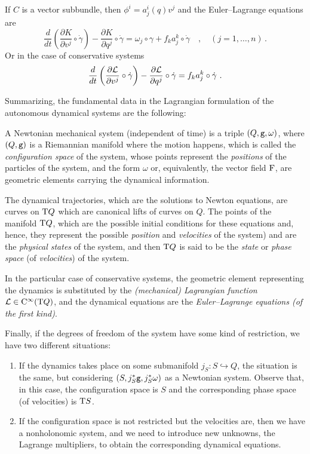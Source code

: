 \documentclass[12pt]{report}
\def\derpar#1#2{\frac{\partial{#1}}{\partial{#2}}}
\def\Lag{{\cal L}}
\def\Tan{{\rm T}}
\def\Cinfty{{\rm C}^\infty}
\begin{document}
If $C$ is a vector subbundle, then  $\phi^i=a^{i}_{j}(q)v^{j}$ and the Euler--Lagrange equations are
$$
\frac{d}{d t}\left(\derpar{K}{v^j}\circ\dot\gamma\right)-
\derpar{K}{q^j}\circ\dot\gamma=
\omega_j\circ\gamma +f_ka^k_j\circ\dot\gamma
\quad , \quad (j=1,\ldots ,n)\, .
$$
Or in the case of conservative systems
$$
\frac{d}{d t}\left(\derpar{\Lag }{v^j}\circ\dot\gamma\right)-
\derpar{\Lag}{q^j}\circ\dot\gamma=
f_ka^k_j\circ\dot\gamma \ .
$$

\vspace{0,5cm}

Summarizing, the fundamental data in the Lagrangian formulation
of the autonomous dynamical systems are the following:

A Newtonian mechanical system (independent of time) is a  triple $(Q,{\tt g},\omega )$, where
$(Q,{\tt g})$ is a Riemannian manifold where the motion happens,
which is called the {\sl configuration space} of the system,
whose points represent the {\sl positions} of the particles of the system,
and
the form $\omega$ or, equivalently, the vector field ${\rm F}$,
are geometric elements carrying the dynamical information.

The dynamical trajectories, which are the solutions to Newton equations, 
are curves on $\Tan Q$ which are canonical lifts of curves on $Q$.
The points of the manifold $\Tan Q$,
which are the possible initial conditions for these equations 
and, hence, they represent  the possible {\sl position} and {\sl velocities}
of the system) and are the {\sl physical states} of the  system, and
then $\Tan Q$ is said to be the
 {\sl state} or {\sl phase space} (of {\sl velocities\/}) of the system.

In the particular case of conservative systems,
the geometric element representing the dynamics is substituted
by the  {\sl (mechanical) Lagrangian function}
$\Lag\in\Cinfty (\Tan Q)$, and  the dynamical equations
are  the {\sl Euler--Lagrange equations (of the first kind)}.

Finally, if  the degrees of freedom of the system
have some kind of restriction, we have two different situations: 
\begin{enumerate}
\item If the dynamics takes place on some submanifold
$j_S\colon S\hookrightarrow Q$, the situation is the same, but considering
$(S,j_S^*{\tt g},j_S^*\omega)$  as a Newtonian system.
Observe that, in this case, the configuration space is $S$
and the corresponding phase space (of velocities) is $\Tan S$.
\item If the configuration space is not restricted but the velocities are, then we have a nonholonomic system, and we need to introduce new unknowns, the Lagrange multipliers, to obtain the corresponding dynamical equations. 
\end{enumerate}
\end{document}
